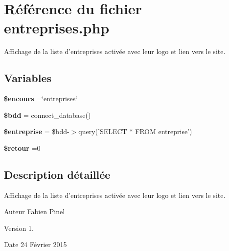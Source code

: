 \hypertarget{entreprises_8php}{\section{Référence du fichier entreprises.\-php}
\label{entreprises_8php}
}


Affichage de la liste d'entreprises activée avec leur logo et lien vers le site.  


\subsection*{Variables}
\begin{DoxyCompactItemize}
\item 
\hypertarget{entreprises_8php_af7b0e56292699e6983c24fbbf70ce08d}{{\bfseries \$encours} =\char`\"{}entreprises\char`\"{}}\label{entreprises_8php_af7b0e56292699e6983c24fbbf70ce08d}

\item 
\hypertarget{entreprises_8php_a94f91e878bce0991e2cd595c5dd79b3f}{{\bfseries \$bdd} = connect\-\_\-database()}\label{entreprises_8php_a94f91e878bce0991e2cd595c5dd79b3f}

\item 
\hypertarget{entreprises_8php_a6d3423f147c69f4f47f014654a57fc93}{{\bfseries \$entreprise} = \$bdd-\/$>$query('S\-E\-L\-E\-C\-T $\ast$ F\-R\-O\-M entreprise')}\label{entreprises_8php_a6d3423f147c69f4f47f014654a57fc93}

\item 
\hypertarget{entreprises_8php_a864921c956cf199fe5e99e92ba15309b}{{\bfseries \$retour} =0}\label{entreprises_8php_a864921c956cf199fe5e99e92ba15309b}

\end{DoxyCompactItemize}


\subsection{Description détaillée}
Affichage de la liste d'entreprises activée avec leur logo et lien vers le site. \begin{DoxyAuthor}{Auteur}
Fabien Pinel 
\end{DoxyAuthor}
\begin{DoxyVersion}{Version}
1. 
\end{DoxyVersion}
\begin{DoxyDate}{Date}
24 Février 2015 
\end{DoxyDate}
